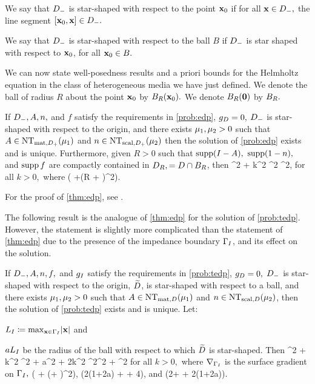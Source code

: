   We say that $D_{-}$ is star-shaped with respect to the point $\mathbf{x}_{0}$ if for all $\mathbf{x} \in D_{-},$ the line segment $\mleft[\bxz,\bx\mright] \in \Dm.$

  We say that $D_{-}$ is star-shaped with respect to the ball $B$ if $D_{-}$ is star shaped with respect to $\mathbf{x}_{0}$, for all $\mathbf{x}_{0} \in B.$
  \ede

We can now state well-posedness results and a priori bounds for the Helmholtz equation in the class of heterogeneous media we have just defined.  We denote the ball of radius $R$ about the point $\mathbf{x}_{0}$ by $\Ball{R}{\bxz}.$ We denote $\Ball{R}{\bfzero}$ by $B_{R}.$



\label{thm:edp}
If $D_{-}, A, n,$ and $f$ satisfy the requirements in \cref{prob:edp}, $g_{D} = 0,$ $D_{-}$ is star-shaped with respect to the origin, and there exists $\mu_{1}, \mu_{2} > 0$ such that $A \in \NTADp{\muo}$ and $n \in \NTnDp{\mut}$ then the solution of \cref{prob:edp} exists and is unique. Furthermore, given $R>0$ such that $\supp\mleft(I-A\mright),$ $\operatorname{supp}(1-n),$ and $\operatorname{supp} f$ are compactly contained in $D_{R}, = D \cap B_{R}$, then
\beqs
\muo {}^2 + \mut k^2 ^2 \leq \Co {}^2,
\eeqs
for all $k>0,$ where
\beqs
\Co {}\mleft( +\mleft(R + \mright)^2\mright).
\eeqs
\enth

For the proof of \cref{thm:edp}, see \cite[Theorem 2.5]{GrPeSp:19}.

The following result is the analogue of \cref{thm:edp} for the solution of \cref{prob:tedp}. However, the statement is slightly more complicated than the statement of \cref{thm:edp} due to the presence of the impedance boundary $\Gamma_{I}$, and its effect on the solution.

\label{thm:tedp}
If $D_{-}, A, n, f,$ and $g_{I}$ satisfy the requirements in \cref{prob:tedp}, $g_{D} = 0,$ $D_{-}$ is star-shaped with respect to the origin, $\widetilde{D}$, is star-shaped with respect to a ball, and there exists $\mu_{1}, \mu_{2} > 0$ such that $A \in \NTAD{\muo}$ and $n \in \NTnD{\mut}$, then the solution of \cref{prob:tedp} exists and is unique. Let:
\bit
\item $\LI \de \max_{\bx \in \GI} \abs{\bx}$ and
\item $aL_{I}$ be the radius of the ball with respect to which $\widetilde{D}$ is star-shaped.
    \eit
Then
\beq\label{eq:tedpbound}
  \muo {}^2 + \mut k^2 ^2 + a\LI{}^2 + 2\LI k^2 ^2\leq \Ct {}^2 + \Cttilde \NLtGI{\gI}^2
\eeq
for all $k>0,$ where $\nabla_{\Gamma_{I}}$ is the surface gradient on $\Gamma_{I},$
\beqs
\Ct {}\mleft( + \mleft(\beta + \mright)^2\mright),
\eeqs
\beqs
\Cttilde {}\mleft(2\mleft(1+\frac2a\mright) + \frac\beta{\LI} + 4\mright)\LI,
\eeqs
and
\beqs
\beta \de \LI \mleft(2+ + 2\mleft(1+\frac2a\mright)\mright).
\eeqs
\enth

